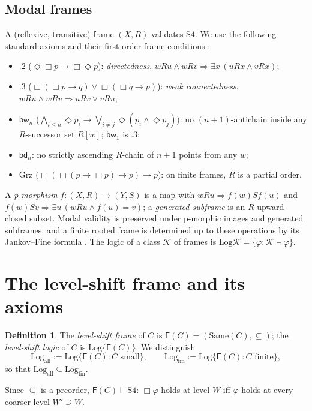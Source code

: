 \documentclass[11pt]{amsart}
\theoremstyle{definition}
\newtheorem{defi}[thm]{Definition}
\newcommand{\Same}{\mathrm{Same}}
\newcommand{\Log}{\mathrm{Log}}
\newcommand{\Fr}{\mathsf{F}}
\newcommand{\bw}{\mathsf{bw}}
\newcommand{\bd}{\mathsf{bd}}
\newcommand{\Grz}{\mathrm{Grz}}
\begin{document}
\subsection{Modal frames}
A (reflexive, transitive) frame $(X,R)$ validates $\mathrm{S4}$. We use the
following standard axioms and their first-order frame conditions
\cite{CZ97,BdRV01}:
\begin{itemize}
\item $.2$ ($\Diamond\Box p\to\Box\Diamond p$): \emph{directedness},
$wRu\wedge wRv\Rightarrow\exists x\,(uRx\wedge vRx)$;
\item $.3$ ($\Box(\Box p\to q)\vee\Box(\Box q\to p)$): \emph{weak
connectedness}, $wRu\wedge wRv\Rightarrow uRv\vee vRu$;
\item $\bw_n$ ($\bigwedge_{i\le n}\Diamond p_i\to\bigvee_{i\ne j}\Diamond(p_i
\wedge\Diamond p_j)$): no $(n{+}1)$-antichain inside any $R$-successor set
$R[w]$; $\bw_1$ is $.3$;
\item $\bd_n$: no strictly ascending $R$-chain of $n{+}1$ points from any $w$;
\item $\Grz$ ($\Box(\Box(p\to\Box p)\to p)\to p$): on finite frames, $R$ is a
partial order.
\end{itemize}
A \emph{p-morphism} $f\colon(X,R)\to(Y,S)$ is a map with $wRu\Rightarrow
f(w)Sf(u)$ and $f(w)Sv\Rightarrow\exists u\,(wRu\wedge f(u)=v)$; a
\emph{generated subframe} is an $R$-upward-closed subset. Modal validity is
preserved under p-morphic images and generated subframes, and a finite rooted
frame is determined up to these operations by its Jankov--Fine formula
\cite{CZ97}. The logic of a class $\mathcal K$ of frames is
$\Log\mathcal K=\{\varphi:\mathcal K\models\varphi\}$.

\section{The level-shift frame and its axioms}\label{sec:axioms}

\begin{defi}\label{def:frame}
The \emph{level-shift frame} of $C$ is $\Fr(C)=(\Same(C),\subseteq)$; the
\emph{level-shift logic} of $C$ is $\Log\{\Fr(C)\}$. We distinguish
\[
\Log_{\mathrm{all}}:=\Log\{\Fr(C):C\text{ small}\},\qquad
\Log_{\mathrm{fin}}:=\Log\{\Fr(C):C\text{ finite}\},
\]
so that $\Log_{\mathrm{all}}\subseteq\Log_{\mathrm{fin}}$.
\end{defi}

Since $\subseteq$ is a preorder, $\Fr(C)\models\mathrm{S4}$: $\Box\varphi$ holds
at level $W$ iff $\varphi$ holds at every coarser level $W'\supseteq W$.
\end{document}
